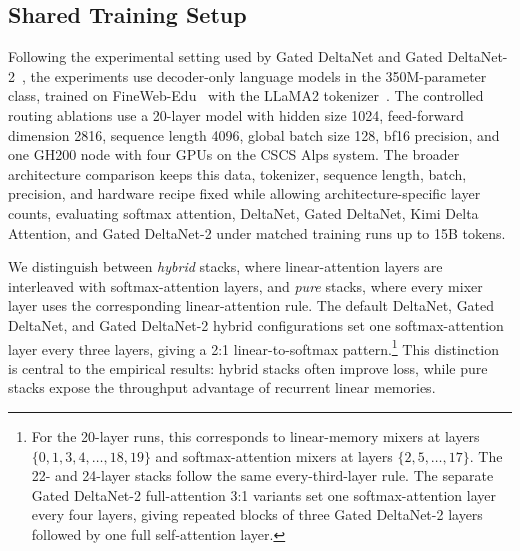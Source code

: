 \documentclass{article}
\begin{document}
\subsection{Shared Training Setup}

Following the experimental setting used by Gated DeltaNet and Gated DeltaNet-2~\cite{yang2024gdn,hatamizadeh2026gdn2}, the experiments use decoder-only language models in the 350M-parameter class, trained on FineWeb-Edu~\cite{penedo2024fineweb} with the LLaMA2 tokenizer~\cite{touvron2023llama2}. The controlled routing ablations use a 20-layer model with hidden size 1024, feed-forward dimension 2816, sequence length 4096, global batch size 128, bf16 precision, and one GH200 node with four GPUs on the CSCS Alps system. The broader architecture comparison keeps this data, tokenizer, sequence length, batch, precision, and hardware recipe fixed while allowing architecture-specific layer counts, evaluating softmax attention, DeltaNet, Gated DeltaNet, Kimi Delta Attention, and Gated DeltaNet-2 under matched training runs up to 15B tokens.

We distinguish between \emph{hybrid} stacks, where linear-attention layers are interleaved with softmax-attention layers, and \emph{pure} stacks, where every mixer layer uses the corresponding linear-attention rule. The default DeltaNet, Gated DeltaNet, and Gated DeltaNet-2 hybrid configurations set one softmax-attention layer every three layers, giving a 2:1 linear-to-softmax pattern.\footnote{For the 20-layer runs, this corresponds to linear-memory mixers at layers $\{0,1,3,4,\ldots,18,19\}$ and softmax-attention mixers at layers $\{2,5,\ldots,17\}$. The 22- and 24-layer stacks follow the same every-third-layer rule. The separate Gated DeltaNet-2 full-attention 3:1 variants set one softmax-attention layer every four layers, giving repeated blocks of three Gated DeltaNet-2 layers followed by one full self-attention layer.} This distinction is central to the empirical results: hybrid stacks often improve loss, while pure stacks expose the throughput advantage of recurrent linear memories.
\end{document}

